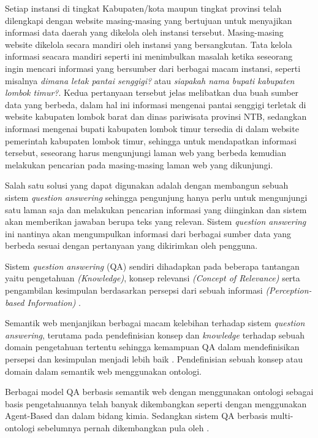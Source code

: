Setiap instansi di tingkat Kabupaten/kota maupun tingkat provinsi telah dilengkapi dengan website masing-masing yang bertujuan untuk menyajikan informasi data daerah yang dikelola oleh instansi tersebut. Masing-masing website dikelola secara mandiri oleh instansi yang bersangkutan. Tata kelola informasi seacara mandiri seperti ini menimbulkan masalah ketika seseorang ingin mencari informasi yang bersumber dari berbagai macam instansi, seperti misalnya \emph{dimana letak pantai senggigi?} atau \emph{siapakah nama bupati kabupaten lombok timur?}. Kedua pertanyaan tersebut jelas melibatkan dua buah sumber data yang berbeda, dalam hal ini informasi mengenai pantai senggigi terletak di website kabupaten lombok barat dan dinas pariwisata provinsi NTB, sedangkan informasi mengenai bupati kabupaten lombok timur tersedia di dalam website pemerintah kabupaten lombok timur, sehingga untuk mendapatkan informasi tersebut, seseorang harus mengunjungi laman web yang berbeda kemudian melakukan pencarian pada masing-masing laman web yang dikunjungi. 

Salah satu solusi yang dapat digunakan adalah dengan membangun sebuah sistem \textit{question answering} sehingga pengunjung hanya perlu untuk mengunjungi satu laman saja dan melakukan pencarian informasi yang diinginkan dan sistem akan memberikan jawaban berupa teks yang relevan. Sistem \emph{question answering} ini nantinya akan mengumpulkan informasi dari berbagai sumber data yang berbeda sesuai dengan pertanyaan yang dikirimkan oleh pengguna.

Sistem \textit{question answering} (QA) sendiri dihadapkan pada beberapa tantangan yaitu pengetahuan \textit{(Knowledge)}, konsep relevansi \textit{(Concept of Relevance)} serta pengambilan kesimpulan berdasarkan persepsi dari sebuah informasi \textit{(Perception-based Information)} \citep{zadeh}.

Semantik web menjanjikan berbagai macam kelebihan terhadap sistem \textit{question answering}, terutama pada pendefinisian konsep dan \textit{knowledge} terhadap sebuah domain pengetahuan tertentu sehingga kemampuan QA dalam mendefinisikan persepsi dan kesimpulan menjadi lebih baik \citep*{guo_zhang}. Pendefinisian sebuah konsep atau domain dalam semantik web menggunakan ontologi.

Berbagai model QA berbasis semantik web dengan menggunakan ontologi sebagai basis pengetahuannya telah banyak dikembangkan seperti \citet*{guo_zhang} dengan menggunakan Agent-Based dan \citet*{angele} dalam bidang kimia. Sedangkan sistem QA berbasis multi-ontologi sebelumnya pernah dikembangkan pula oleh \citet*{lopez}.

